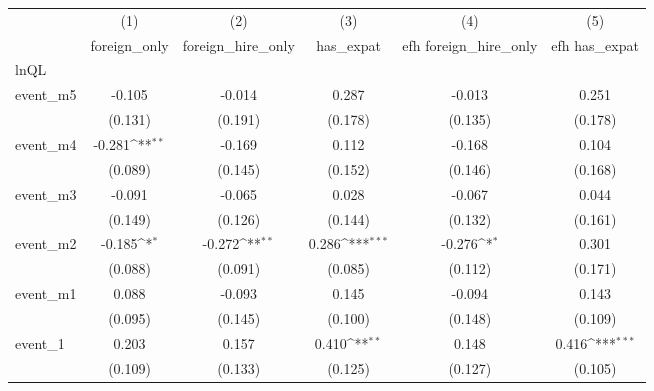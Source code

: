 {
\def\sym#1{\ifmmode^{#1}\else\(^{#1}\)\fi}
\begin{tabular}{l*{5}{c}}
\hline\hline
            &\multicolumn{1}{c}{(1)}&\multicolumn{1}{c}{(2)}&\multicolumn{1}{c}{(3)}&\multicolumn{1}{c}{(4)}&\multicolumn{1}{c}{(5)}\\
            &\multicolumn{1}{c}{foreign\_only}&\multicolumn{1}{c}{foreign\_hire\_only}&\multicolumn{1}{c}{has\_expat}&\multicolumn{1}{c}{efh foreign\_hire\_only}&\multicolumn{1}{c}{efh has\_expat}\\
\hline
lnQL        &                     &                     &                     &                     &                     \\
event\_m5    &      -0.105         &      -0.014         &       0.287         &      -0.013         &       0.251         \\
            &     (0.131)         &     (0.191)         &     (0.178)         &     (0.135)         &     (0.178)         \\
[1em]
event\_m4    &      -0.281\sym{**} &      -0.169         &       0.112         &      -0.168         &       0.104         \\
            &     (0.089)         &     (0.145)         &     (0.152)         &     (0.146)         &     (0.168)         \\
[1em]
event\_m3    &      -0.091         &      -0.065         &       0.028         &      -0.067         &       0.044         \\
            &     (0.149)         &     (0.126)         &     (0.144)         &     (0.132)         &     (0.161)         \\
[1em]
event\_m2    &      -0.185\sym{*}  &      -0.272\sym{**} &       0.286\sym{***}&      -0.276\sym{*}  &       0.301         \\
            &     (0.088)         &     (0.091)         &     (0.085)         &     (0.112)         &     (0.171)         \\
[1em]
event\_m1    &       0.088         &      -0.093         &       0.145         &      -0.094         &       0.143         \\
            &     (0.095)         &     (0.145)         &     (0.100)         &     (0.148)         &     (0.109)         \\
[1em]
event\_1     &       0.203         &       0.157         &       0.410\sym{**} &       0.148         &       0.416\sym{***}\\
            &     (0.109)         &     (0.133)         &     (0.125)         &     (0.127)         &     (0.105)         \\

\end{tabular}}
